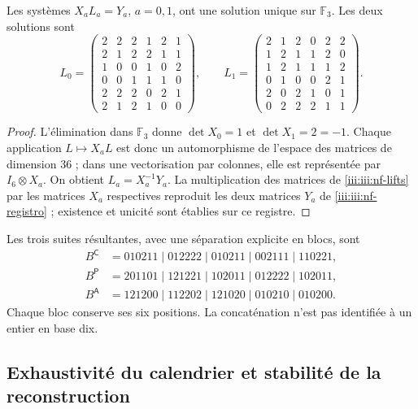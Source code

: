 \begin{proposition}
\label{iii:iii:nf-unicidad}
Les systèmes $X_aL_a=Y_a$, $a=0,1$, ont une solution unique sur
$\mathbb F_3$. Les deux solutions sont
\begingroup\small
\begin{equation}
L_0=\begin{pmatrix}
2&2&2&1&2&1\\2&1&2&2&1&1\\1&0&0&1&0&2\\
0&0&1&1&1&0\\2&2&2&0&2&1\\2&1&2&1&0&0
\end{pmatrix},\qquad
L_1=\begin{pmatrix}
2&1&2&0&2&2\\1&2&1&1&2&0\\1&2&1&1&1&2\\
0&1&0&0&2&1\\2&0&2&1&0&1\\0&2&2&2&1&1
\end{pmatrix}.
\label{iii:iii:nf-lifts}
\end{equation}
\endgroup
\end{proposition}

\begin{proof}
L’élimination dans $\mathbb F_3$ donne $\det X_0=1$ et
$\det X_1=2=-1$. Chaque application $L\mapsto X_aL$ est donc
un automorphisme de l’espace des matrices de dimension $36$ ; dans une
vectorisation par colonnes, elle est représentée par $I_6\otimes X_a$.
On obtient $L_a=X_a^{-1}Y_a$. La multiplication des matrices de
\eqref{iii:iii:nf-lifts} par les matrices $X_a$ respectives reproduit les
deux matrices $Y_a$ de \eqref{iii:iii:nf-registro} ; existence et unicité
sont établies sur ce registre.
\end{proof}

Les trois suites résultantes, avec une séparation explicite en blocs,
sont
\begin{align*}
 B^{\mathsf C}&=010211\mid012222\mid010211\mid002111\mid110221,\\
 B^{\mathsf P}&=201101\mid121221\mid102011\mid012222\mid102011,\\
 B^{\mathsf A}&=121200\mid112202\mid121020\mid010210\mid010200.
\end{align*}
Chaque bloc conserve ses six positions. La concaténation n’est pas
identifiée à un entier en base dix.

\subsection{Exhaustivité du calendrier et stabilité de la reconstruction}

